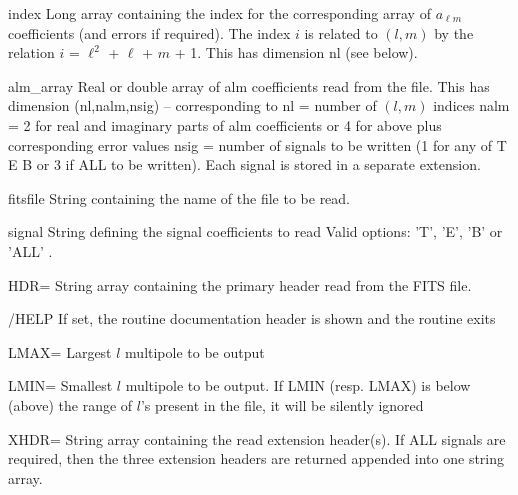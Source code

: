 \begin{qualifiers}
  \begin{qulist}{} %
    \item[index]  Long array containing the index for the corresponding
                 array of $a_{\ell m}$ coefficients (and errors if required). The
                 index ${i}$ is related to $(l,m)$ by the relation \hfill\newline
                 $i$ = $\ell^2$ + $\ell$ + $m$ + 1. \newline This has dimension
    nl (see below).
    \item[alm\_array]  Real or double array of alm coefficients read from the
      file. This has dimension (nl,nalm,nsig) -- corresponding to\hfill\newline
      nl   = number of $(l,m)$ indices \hfill\newline
      nalm = 2 for real and imaginary parts of alm coefficients or
             4 for above plus corresponding error values \hfill\newline
      nsig = number of signals to be written (1 for any of T E B
             or 3 if ALL to be written). Each signal is stored
             in a separate extension.
    \item[fitsfile] String containing the name of the file to be
      read.
    \item[signal] String defining the signal coefficients to read
                  Valid options: 'T', 'E', 'B' or 'ALL' \hfill\newline
	.  
  \end{qulist}
\end{qualifiers}

\begin{keywords}
  \begin{kwlist}{} %
    \item[HDR=] String array containing the primary header read from the FITS
      file. 
    \item[/HELP] If set, the routine documentation header is shown and the routine exits	
    \item[LMAX=] Largest $l$ multipole  to be output
    \item[LMIN=] Smallest $l$ multipole to be output. If LMIN (resp. LMAX) is below (above) the range of $l$'s present in the file,
              it will be silently ignored
    \item[XHDR=] String array containing the read extension header(s). If
                  ALL signals are required, then the three extension 
                  headers are returned appended into one string array.
  \end{kwlist}
\end{keywords}  

